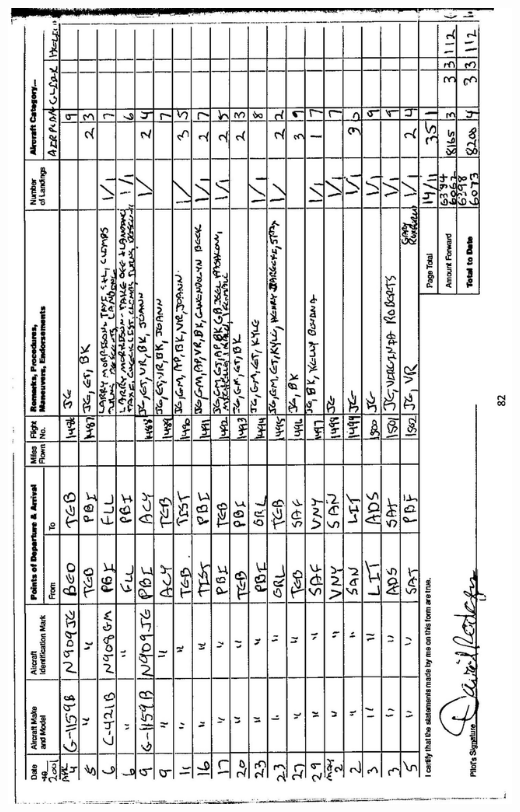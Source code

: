 \documentclass[10pt]{article}
\begin{document}
\includegraphics[max width=\textwidth, center]{2025_02_27_dd68c3d38de88f0516d9g-086}\\
\end{document}
